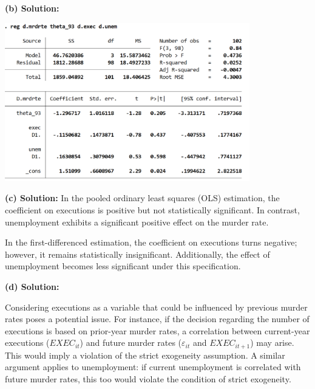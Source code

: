 \documentclass{article}
\begin{document}
\textbf{(b) Solution:}
\begin{center}
    
    \includegraphics[width=0.8\textwidth]{HW4/P4-2.jpg}
    
\end{center}

\textbf{(c) Solution:}
In the pooled ordinary least squares (OLS) estimation, the coefficient on executions is positive but not statistically significant. In contrast, unemployment exhibits a significant positive effect on the murder rate.

In the first-differenced estimation, the coefficient on executions turns negative; however, it remains statistically insignificant. Additionally, the effect of unemployment becomes less significant under this specification.

\textbf{(d) Solution:}

Considering executions as a variable that could be influenced by previous murder rates poses a potential issue. For instance, if the decision regarding the number of executions is based on prior-year murder rates, a correlation between current-year executions (\(EXEC_{it}\)) and future murder rates (\(\varepsilon_{it}\) and \(EXEC_{it+1}\)) may arise. This would imply a violation of the strict exogeneity assumption. A similar argument applies to unemployment: if current unemployment is correlated with future murder rates, this too would violate the condition of strict exogeneity.
\end{document}
